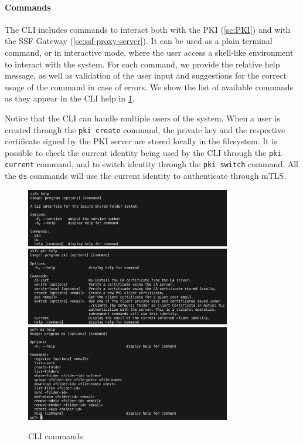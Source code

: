 \paragraph{Commands}
The CLI includes commands to interact both with the PKI (\cref{sc:PKI}) 
and with the SSF Gateway (\cref{sc:ssf-proxy-server}).
It can be used as a plain terminal command, or
in interactive mode, where the user access
a shell-like environment to interact with the system.
For each command, we provide the relative help message,
as well as validation of the user input and 
suggestions for the correct usage of the command
in case of errors.
We show the list of available commands as they appear
in the CLI help in \cref{fig:climain}. 

Notice that the CLI can handle multiple users of
the system. When a user is created through the
\texttt{pki create} command, the private key and
the respective certificate signed by the PKI server
are stored locally in the filesystem.
It is possible to check the current identity being
used by the CLI through the \texttt{pki current} command,
and to switch identity through the \texttt{pki switch} command.
All the \texttt{ds} commands
will use the current identity to authenticate 
through mTLS.

\begin{figure}
    \centering
    \includegraphics[width=0.8\textwidth]{figures/climain.png}
    \includegraphics[width=0.8\textwidth]{figures/pkimain.png}
    \includegraphics[width=0.8\textwidth]{figures/dsmain.png}
    \caption{CLI commands}
    \label{fig:climain}
\end{figure}

